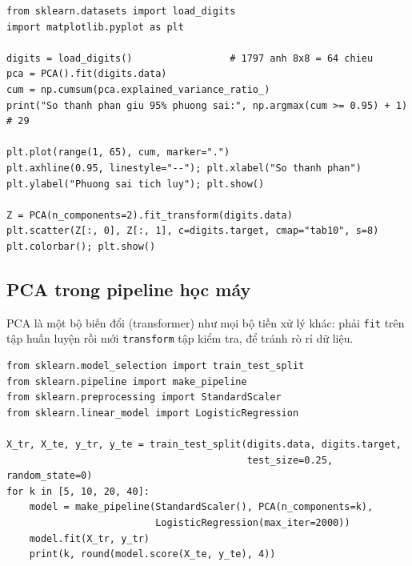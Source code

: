 \begin{lstlisting}[caption={PCA trên tập chữ số viết tay}]
from sklearn.datasets import load_digits
import matplotlib.pyplot as plt

digits = load_digits()                 # 1797 anh 8x8 = 64 chieu
pca = PCA().fit(digits.data)
cum = np.cumsum(pca.explained_variance_ratio_)
print("So thanh phan giu 95% phuong sai:", np.argmax(cum >= 0.95) + 1)   # 29

plt.plot(range(1, 65), cum, marker=".")
plt.axhline(0.95, linestyle="--"); plt.xlabel("So thanh phan")
plt.ylabel("Phuong sai tich luy"); plt.show()

Z = PCA(n_components=2).fit_transform(digits.data)
plt.scatter(Z[:, 0], Z[:, 1], c=digits.target, cmap="tab10", s=8)
plt.colorbar(); plt.show()
\end{lstlisting}



\subsection{PCA trong pipeline học máy}

PCA là một bộ biến đổi (transformer) như mọi bộ tiền xử lý khác: phải \texttt{fit} trên tập huấn luyện rồi mới \texttt{transform} tập kiểm tra, để tránh rò rỉ dữ liệu.

\begin{lstlisting}[caption={StandardScaler + PCA + Logistic Regression}]
from sklearn.model_selection import train_test_split
from sklearn.pipeline import make_pipeline
from sklearn.preprocessing import StandardScaler
from sklearn.linear_model import LogisticRegression

X_tr, X_te, y_tr, y_te = train_test_split(digits.data, digits.target,
                                          test_size=0.25, random_state=0)
for k in [5, 10, 20, 40]:
    model = make_pipeline(StandardScaler(), PCA(n_components=k),
                          LogisticRegression(max_iter=2000))
    model.fit(X_tr, y_tr)
    print(k, round(model.score(X_te, y_te), 4))
\end{lstlisting}

